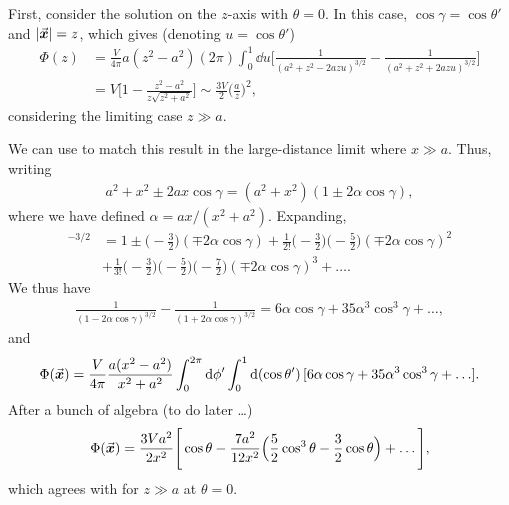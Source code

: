 First, consider the solution on the $z$-axis with $\theta = 0$.
In this case, $\cos{\gamma} = \cos{\theta'}$ and $|\va*{x}| = z$, which gives (denoting $u = \cos{\theta'}$)
\begin{align}
    \label{eq:pot-z}
    \Phi(z) &= \frac{V}{4 \pi} a(z^2 - a^2) (2 \pi) \int_{0}^{1} \dd{u} \Bigg[ \frac{1}{(a^2 + z^2 - 2azu)^{3/2}} - \frac{1}{(a^2 + z^2 + 2azu)^{3/2}} \Bigg] \nonumber \\
    &= V \Bigg[ 1 - \frac{z^2 - a^2}{z \sqrt{z^2 + a^2}} \Bigg] \sim \frac{3 V}{2} \Big( \frac{a}{z} \Big)^2
,\end{align}
considering the limiting case $z \gg a$.

We can use  to match this result in the large-distance limit where $x \gg a$.
Thus, writing 
\begin{eqnarray}
    a^2 + x^2 \pm 2ax\cos{\gamma} = (a^2 + x^2)(1 \pm 2\alpha \cos{\gamma})
,\end{eqnarray}
where we have defined $\alpha = ax/(x^2 + a^2)$.
Expanding,
\begin{align}
    [1 \pm 2 \alpha \cos{\gamma}]^{-3/2} &= 1 \pm \Big(-\frac{3}{2}\Big)(\mp 2 \alpha \cos{\gamma}) + \frac{1}{2!} \Big( -\frac{3}{2} \Big) \Big( -\frac{5}{2} \Big) (\mp 2 \alpha \cos{\gamma})^2 \nonumber \\
    &+ \frac{1}{3!} \Big( -\frac{3}{2} \Big) \Big( -\frac{5}{2} \Big) \Big( -\frac{7}{2} \Big) (\mp 2 \alpha \cos{\gamma})^3 + \ldots
.\end{align}
We thus have
\begin{align}
    \frac{1}{(1 - 2 \alpha \cos{\gamma})^{3/2}} - \frac{1}{(1 + 2 \alpha \cos{\gamma})^{3/2}} = 6 \alpha \cos{\gamma} + 35 \alpha^3 \cos^3{\gamma} + \ldots
,\end{align}
and
\begin{align}
    \Phi(\va*{x}) = \frac{V}{4 \pi} \frac{a(x^2 - a^2)}{x^2 + a^2} \int_{0}^{2\pi} \dd{\phi'} \int_{0}^{1} \dd{(\cos{\theta'})} [6 \alpha \cos{\gamma} + 35 \alpha^3 \cos^3{\gamma} + \ldots]
.\end{align}
{\color{red} After a bunch of algebra (to do later \ldots)}
\begin{align}
    \Phi(\va*{x}) = \frac{3 V a^2}{2 x^2} \Bigg[ \cos{\theta} - \frac{7a^2}{12 x^2} \Big( \frac{5}{2} \cos^3{\theta} - \frac{3}{2} \cos{\theta} \Big) + \ldots \Bigg]
,\end{align}
which agrees with  for $z \gg a$ at $\theta = 0$.


